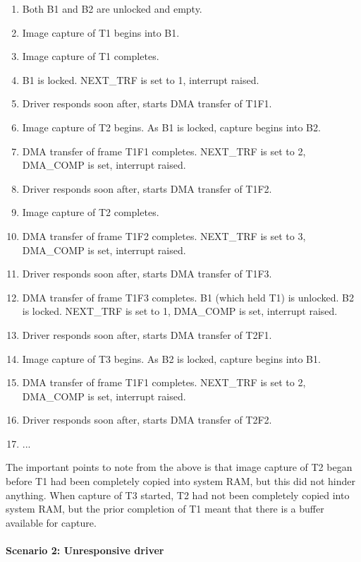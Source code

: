 \documentclass[12pt]{article}
\begin{document}
\begin{enumerate}
\item Both B1 and B2 are unlocked and empty.
\item Image capture of T1 begins into B1.
\item Image capture of T1 completes.
\item B1 is locked. NEXT\_TRF is set to 1, interrupt raised.
\item Driver responds soon after, starts DMA transfer of T1F1.
\item Image capture of T2 begins. As B1 is locked, capture begins into B2.
\item DMA transfer of frame T1F1 completes. NEXT\_TRF is set to 2, DMA\_COMP is set, interrupt raised.
\item Driver responds soon after, starts DMA transfer of T1F2.
\item Image capture of T2 completes.
\item DMA transfer of frame T1F2 completes. NEXT\_TRF is set to 3, DMA\_COMP is set, interrupt raised.
\item Driver responds soon after, starts DMA transfer of T1F3.
\item DMA transfer of frame T1F3 completes. B1 (which held T1) is unlocked. B2 is locked. NEXT\_TRF is set to 1, DMA\_COMP is set, interrupt raised.
\item Driver responds soon after, starts DMA transfer of T2F1.
\item Image capture of T3 begins. As B2 is locked, capture begins into B1.
\item DMA transfer of frame T1F1 completes. NEXT\_TRF is set to 2, DMA\_COMP is set, interrupt raised.
\item Driver responds soon after, starts DMA transfer of T2F2.
\item ...
\end{enumerate}

The important points to note from the above is that image capture of T2 began before T1 had been completely copied into system RAM, but this did not hinder anything. When capture of T3 started, T2 had not been completely copied into system RAM, but the prior completion of T1 meant that there is a buffer available for capture.

\paragraph{Scenario 2: Unresponsive driver}
\end{document}

